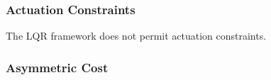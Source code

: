 \documentclass[letterpaper, 10pt, english, conference]{IEEEtran}
\begin{document}
\begin{comment}
What if $\hat{Q}$ is indefinite? 

Options:

1. Use sequential QP techniques like shifting eigenvalues to make
$\hat{Q}$ definite. 

http://www.cs.berkeley.edu/\textasciitilde{}pabbeel/cs287-fa11/slides/NonlinearOptimizationForOptimalControl.pdf
(Page 11 bottom slide)

2. LQR with indefnite weighting matrices

Chapter 9 of:

http://epubs.siam.org.libproxy.mit.edu/doi/book/10.1137/1.9781611970760

(same book) 

http://books.google.com/books?id=bD\_83idGZ2cC\&lpg=PA211\&ots=q3U7u4rmNc\&dq=indefinite\%20LQR\&pg=PA211\#v=onepage\&q\&f=false

http://www.tandfonline.com/doi/abs/10.1080/00207178408933184\#preview
\end{comment}



\subsubsection{Actuation Constraints}

The LQR framework does not permit actuation constraints.

\begin{comment}
Say the LQR solution returns a control action $u\not\in\mathcal{U}$
(the set of permitted actions). Simply choosing a $u'=\alpha u$ such
that $u'\in\mathcal{U}$ while minimizing $\alpha^{2}$ (so that $u'$
is close to $u$) intuitively will not explore the space as desired
-- the state won't move along the same direction in general.

To clarify:

if the state of the system is $x_{k}$, then the next state is $x_{k+1}=Ax_{k}+Bu$,
which presumably moves the system toward $x_{rand}$. The state $x_{k+1}'=Ax_{k}+Bu'$
does not, in general, move the system directly toward $x_{rand}$.
\end{comment}



\subsubsection{Asymmetric Cost}

\begin{comment}
http://math.stackexchange.com/a/23397/2256
\end{comment}
\end{document}
